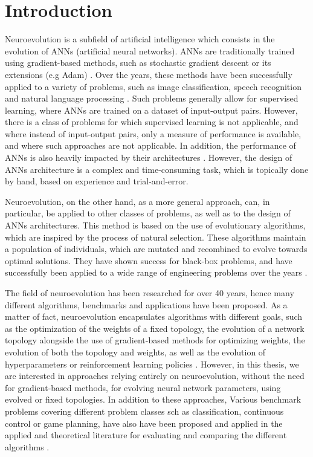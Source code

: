 \chapter{Introduction}

Neuroevolution is a subfield of artificial intelligence which consists in the evolution of ANNs (artificial neural networks).
ANNs are traditionally trained using gradient-based methods, such as stochastic gradient descent or its extensions (e.g Adam) \cite{sgd,adam}.
Over the years, these methods have been successfully applied to a variety of problems, such as image classification, speech recognition and natural language processing \cite{attention,cnn,speech}.
Such problems generally allow for supervised learning, where ANNs are trained on a dataset of input-output pairs.
However, there is a class of problems for which supervised learning is not applicable, and where instead of input-output pairs, only a measure of performance is available, and
where such approaches are not applicable.
In addition, the performance of ANNs is also heavily impacted by their architectures \cite{layers}. However, the design of ANNs architecture is a complex and time-consuming task, which is
topically done by hand, based on experience and trial-and-error.

Neuroevolution, on the other hand, as a more general approach, can, in particular, be applied to other classes of problems, as well as to the design of ANNs architectures.
This method is based on the use of evolutionary algorithms, which are inspired by the process of natural selection. These algorithms maintain a population of individuals,
which are mutated and recombined to evolve towards optimal solutions. They have shown success for black-box problems, and have successfully been applied to a wide range
of engineering problems over the years \cite{openai_es,ea_applications}.

The field of neuroevolution has been researched for over 40 years, hence many different algorithms, benchmarks and applications have been proposed.
As a matter of fact, neuroevolution encapsulates algorithms with different goals, such as the optimization of the weights of a fixed topology, the evolution of a
network topology alongside the use of gradient-based methods for optimizing weights, the evolution of both the topology and weights, as well as the evolution
of hyperparameters or reinforcement learning policies \cite{neuroevolution_trends,neuroevolution_survey,nas_survey,neuroevolution_rl}.
However, in this thesis, we are interested in approaches relying entirely on neuroevolution, without the need for gradient-based methods, for evolving neural network
parameters, using evolved or fixed topologies. In addition to these approaches, Various benchmark problems covering different problem classes sch as classification,
continuous control or game planning, have also have been proposed and applied in the applied and theoretical literature for evaluating and comparing the different algorithms \cite{gym}.

